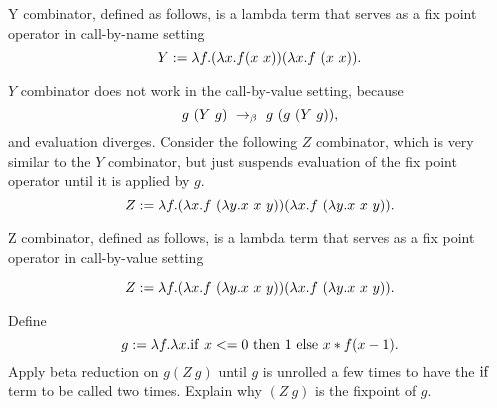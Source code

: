 \begin{definition}[$Y$ Combinator]
\label{def:lcc:recursion::y-combinator}
Y combinator, defined as follows, is a lambda term that serves as a fix point operator in call-by-name setting
\[
Y := \lambda f.  (\lambda x. f (x~  x)) (\lambda x. f~ (x~ x)).
\]
\end{definition}

\begin{gram}[$Z$ Combinator]
\label{grm:lcc:recursion::z-combinator}
$Y$ combinator does not work in the call-by-value setting, because
\[
g~ (Y~ g) ~\rightarrow_{\beta}~ g~ ( g~ (Y~ g)),
\]
and  evaluation diverges.  
%
Consider the following $Z$ combinator, which is very similar
to the $Y$ combinator, but just suspends evaluation of the fix point
operator until it is applied by $g$.  
%
\[
Z :=  \lambda f. (\lambda x. f~ (\lambda y. x~ x~ y)) (\lambda x. f~ (\lambda y. x~ x~ y)).
\]
\end{gram}

\begin{definition}[$Z$ Combinator]
\label{def:lcc:recursion::z-combinator}
Z combinator, defined as follows, is a lambda term that serves as a fix point operator in call-by-value setting

\[
Z :=  \lambda f. (\lambda x. f~ (\lambda y. x~ x~ y)) (\lambda x. f~ (\lambda y. x~ x~ y)).
\]
\end{definition}

\begin{exercise}
\label{xrcs:lcc:recursion::z-combinator}
Define 
\[
g := \lambda f. \lambda x.  \mathrm{if}~x <= 0~\mathrm{then}~1~\mathrm{else}~x*f
      (x-1).
\]
%
Apply beta reduction on $g (Z~ g)$ until $g$ is unrolled a few times
to have the $\mathrm{if}$ term to be called two times.  Explain why $(Z~ g)$
is the fixpoint of $g$.  
\end{exercise}


